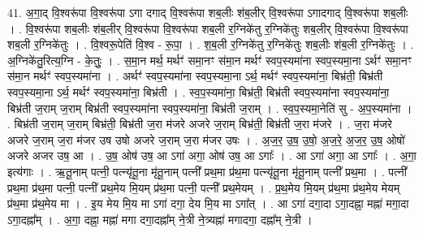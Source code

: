 \documentclass[17pt]{extarticle}
\begin{document}
41. अ॒गा॒द् वि॒श्वरू॑पा वि॒श्वरू॑पा ऽगा दगाद् वि॒श्वरू॑पा शब॒लीः श॑ब॒लीर् वि॒श्वरू॑पा ऽगादगाद् वि॒श्वरू॑पा शब॒लीः । . वि॒श्वरू॑पा शब॒लीः श॑ब॒लीर् वि॒श्वरू॑पा वि॒श्वरू॑पा शब॒ली र॒ग्निके॑तु र॒ग्निके॑तुः शब॒लीर् वि॒श्वरू॑पा वि॒श्वरू॑पा शब॒ली र॒ग्निके॑तुः । . वि॒श्वरू॒पेति॑ वि॒श्व - रू॒पा॒ । . श॒ब॒ली र॒ग्निके॑तु र॒ग्निके॑तुः शब॒लीः श॑ब॒ली र॒ग्निके॑तुः । . अ॒ग्निके॑तु॒रित्य॒ग्नि - के॒तुः॒ । . स॒मा॒न मर्थ॒ मर्थꣳ॑ समा॒नꣳ स॑मा॒न मर्थꣳ॑ स्वप॒स्यमा॑ना स्वप॒स्यमा॒ना ऽर्थꣳ॑ समा॒नꣳ स॑मा॒न मर्थꣳ॑ स्वप॒स्यमा॑ना । . अर्थꣳ॑ स्वप॒स्यमा॑ना स्वप॒स्यमा॒ना ऽर्थ॒ मर्थꣳ॑ स्वप॒स्यमा॑ना॒ बिभ्र॑ती॒ बिभ्र॑ती स्वप॒स्यमा॒ना ऽर्थ॒ मर्थꣳ॑ स्वप॒स्यमा॑ना॒ बिभ्र॑ती । . स्व॒प॒स्यमा॑ना॒ बिभ्र॑ती॒ बिभ्र॑ती स्वप॒स्यमा॑ना स्वप॒स्यमा॑ना॒ बिभ्र॑ती ज॒राम् ज॒राम् बिभ्र॑ती स्वप॒स्यमा॑ना स्वप॒स्यमा॑ना॒ बिभ्र॑ती ज॒राम् । . स्व॒प॒स्यमा॒नेति॑ सु - अ॒प॒स्यमा॑ना । . बिभ्र॑ती ज॒राम् ज॒राम् बिभ्र॑ती॒ बिभ्र॑ती ज॒रा म॑जरे अजरे ज॒राम् बिभ्र॑ती॒ बिभ्र॑ती ज॒रा म॑जरे । . ज॒रा म॑जरे अजरे ज॒राम् ज॒रा म॑जर उष उषो अजरे ज॒राम् ज॒रा म॑जर उषः । . अ॒ज॒र॒ उ॒ष॒ उ॒षो॒ अ॒ज॒रे॒ अ॒ज॒र॒ उ॒ष॒ ओषो॑ अजरे अजर उष॒ आ । . उ॒ष॒ ओष॑ उष॒ आ ऽगा॑ अगा॒ ओष॑ उष॒ आ ऽगाः᳚ । . आ ऽगा॑ अगा॒ आ ऽगाः᳚ । . अ॒गा॒ इत्य॑गाः । . ऋ॒तू॒नाम् पत्नी॒ पत्न्यृ॑तू॒ना मृ॑तू॒नाम् पत्नी᳚ प्रथ॒मा प्र॑थ॒मा पत्न्यृ॑तू॒ना मृ॑तू॒नाम् पत्नी᳚ प्रथ॒मा । . पत्नी᳚ प्रथ॒मा प्र॑थ॒मा पत्नी॒ पत्नी᳚ प्रथ॒मेय मि॒यम् प्र॑थ॒मा पत्नी॒ पत्नी᳚ प्रथ॒मेयम् । . प्र॒थ॒मेय मि॒यम् प्र॑थ॒मा प्र॑थ॒मेय मेयम् प्र॑थ॒मा प्र॑थ॒मेय मा । . इ॒य मेय मि॒य मा ऽगा॑ दगा॒ देय मि॒य मा ऽगा᳚त् । . आ ऽगा॑ दगा॒दा ऽगा॒दह्ना॒ मह्ना॑ मगा॒दा ऽगा॒दह्ना᳚म् । . अ॒गा॒ दह्ना॒ मह्ना॑ मगा दगा॒दह्ना᳚म् ने॒त्री ने॒त्र्यह्ना॑ मगादगा॒ दह्ना᳚म् ने॒त्री । \newline
\end{document}
